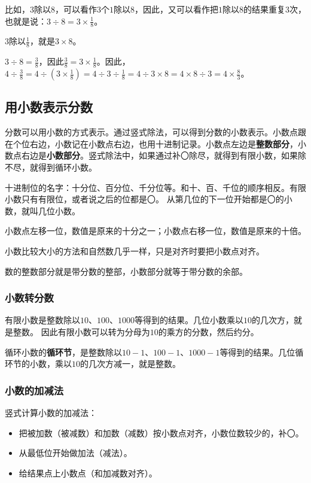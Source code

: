 \documentclass[12pt,UTF8]{ctexart}
\begin{document}
比如，\( 3 \)除以\( 8 \)，可以看作\( 3 \)个\( 1 \)除以\( 8 \)，因此，又可以看作把\( 1 \)除以\( 8 \)的结果重复\( 3 \)次，也就是说：\( 3\div 8 = 3\times \frac{1}{8} \)。

\( 3 \)除以\( \frac{1}{8} \)，就是\( 3\times 8 \)。

\( 3\div 8 = \frac{3}{8} \)，因此\( \frac{3}{8} = 3\times \frac{1}{8} \)。因此，\( 4\div \frac{3}{8} = 4\div \left(3 \times \frac{1}{8}\right) = 4\div 3 \div \frac{1}{8} = 4\div 3 \times 8 = 4\times 8 \div 3 = 4\times \frac{8}{3} \)。

\subsection{用小数表示分数}

分数可以用小数的方式表示。通过竖式除法，可以得到分数的小数表示。小数点跟在个位右边，小数记在小数点右边，也用十进制记录。小数点左边是\textbf{整数部分}，小数点右边是\textbf{小数部分}。竖式除法中，如果通过补〇除尽，就得到有限小数，如果除不尽，就得到循环小数。

十进制位的名字：十分位、百分位、千分位等。和十、百、千位的顺序相反。有限小数只有有限位，或者说之后的位都是〇。
从第几位的下一位开始都是〇的小数，就叫几位小数。    

小数点左移一位，数值是原来的十分之一；小数点右移一位，数值是原来的十倍。

小数比较大小的方法和自然数几乎一样，只是对齐时要把小数点对齐。

数的整数部分就是带分数的整部，小数部分就等于带分数的余部。

\subsubsection{小数转分数}

有限小数是整数除以\( 10 \)、\( 100 \)、\( 1000 \)等得到的结果。几位小数乘以\( 10 \)的几次方，就是整数。
因此有限小数可以转为分母为\( 10 \)的乘方的分数，然后约分。

循环小数的\textbf{循环节}，是整数除以\( 10-1 \)、\( 100-1 \)、\( 1000-1 \)等得到的结果。几位循环节的小数，乘以\( 10 \)的几次方减一，就是整数。

\subsubsection{小数的加减法}

竖式计算小数的加减法：

\begin{itemize}
\item 把被加数（被减数）和加数（减数）按小数点对齐，小数位数较少的，补〇。
\item 从最低位开始做加法（减法）。
\item 给结果点上小数点（和加减数对齐）。
\end{itemize}
\end{document}
